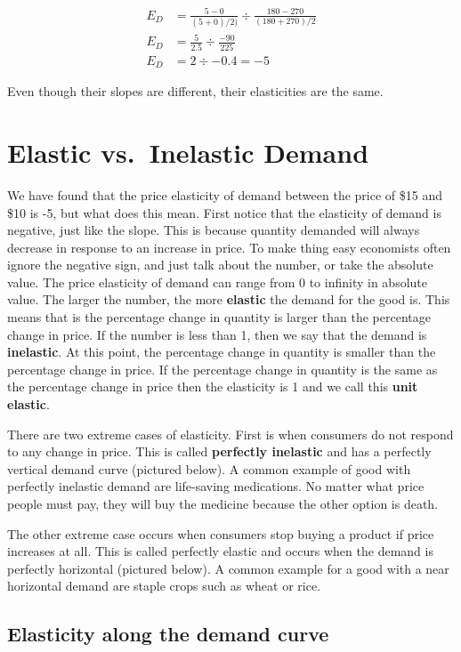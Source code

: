 \documentclass[
]{book}
\begin{document}
\begin{align*}
E_D &= \frac{5-0}{(5+0)/2)} \div \frac{180 - 270}{(180+270)/2}\\
E_D &= \frac{5}{2.5}\div \frac{-90}{225}\\
E_D &= 2 \div -0.4 = -5
\end{align*}

Even though their slopes are different, their elasticities are the same.

\section{Elastic vs.~Inelastic Demand}\label{elastic-vs.-inelastic-demand}

We have found that the price elasticity of demand between the price of \$15 and \$10 is -5, but what does this mean. First notice that the elasticity of demand is negative, just like the slope. This is because quantity demanded will always decrease in response to an increase in price. To make thing easy economists often ignore the negative sign, and just talk about the number, or take the absolute value. The price elasticity of demand can range from 0 to infinity in absolute value. The larger the number, the more \textbf{elastic} the demand for the good is. This means that is the percentage change in quantity is larger than the percentage change in price. If the number is less than 1, then we say that the demand is \textbf{inelastic}. At this point, the percentage change in quantity is smaller than the percentage change in price. If the percentage change in quantity is the same as the percentage change in price then the elasticity is 1 and we call this \textbf{unit elastic}.

There are two extreme cases of elasticity. First is when consumers do not respond to any change in price. This is called \textbf{perfectly inelastic} and has a perfectly vertical demand curve (pictured below). A common example of good with perfectly inelastic demand are life-saving medications. No matter what price people must pay, they will buy the medicine because the other option is death.

The other extreme case occurs when consumers stop buying a product if price increases at all. This is called perfectly elastic and occurs when the demand is perfectly horizontal (pictured below). A common example for a good with a near horizontal demand are staple crops such as wheat or rice.

\subsection{Elasticity along the demand curve}\label{elasticity-along-the-demand-curve}
\end{document}
